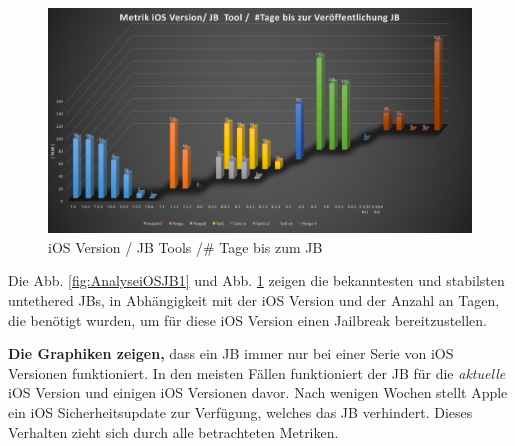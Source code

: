 \begin{figure}[hp!]
        \centering
                \includegraphics[scale=0.35]{Bilder/Frage1_2.png}
        \caption{iOS Version / JB Tools /\# Tage bis zum JB \protect\footnotemark}
        \label{fig:AnalyseiOSJB2}
\end{figure}

Die Abb. \ref{fig:AnalyseiOSJB1} und Abb. \ref{fig:AnalyseiOSJB2} zeigen die bekanntesten und stabilsten untethered JBs, in Abhängigkeit mit der iOS Version und der Anzahl an Tagen, die benötigt wurden, um für diese iOS Version einen Jailbreak bereitzustellen. \par 
\textbf{Die Graphiken zeigen,} dass ein JB immer nur bei einer Serie von iOS Versionen funktioniert. In den meisten Fällen funktioniert der JB für die \textit{\glqq aktuelle\grqq{}} iOS Version und einigen iOS Versionen davor. Nach wenigen Wochen stellt Apple ein iOS Sicherheitsupdate zur Verfügung, welches das JB verhindert. Dieses Verhalten zieht sich durch alle betrachteten Metriken.  
%

